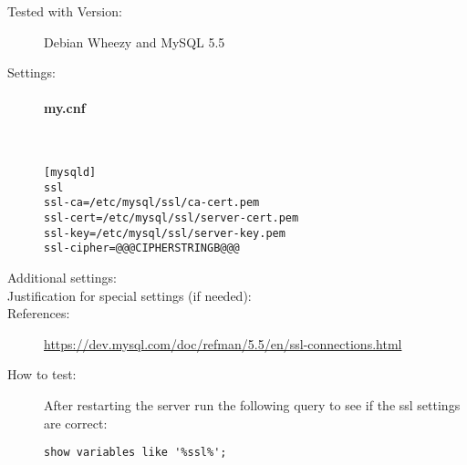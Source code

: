 \begin{description}
\item[Tested with Version:] Debian Wheezy and MySQL 5.5

\item[Settings:] \mbox{}

\paragraph*{my.cnf}\mbox{}\\

\begin{lstlisting}[breaklines]
[mysqld]
ssl
ssl-ca=/etc/mysql/ssl/ca-cert.pem
ssl-cert=/etc/mysql/ssl/server-cert.pem
ssl-key=/etc/mysql/ssl/server-key.pem
ssl-cipher=@@@CIPHERSTRINGB@@@
\end{lstlisting}

\item[Additional settings:]


\item[Justification for special settings (if needed):]


\item[References:]
{\small \url{https://dev.mysql.com/doc/refman/5.5/en/ssl-connections.html}}

\item[How to test:]

After restarting the server run the following query to see if the ssl settings are correct:
\begin{lstlisting}[breaklines]
show variables like '%ssl%';
\end{lstlisting}


\end{description}


